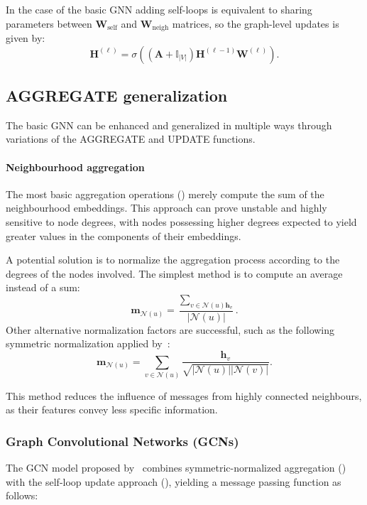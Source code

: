 In the case of the basic GNN adding self-loops is equivalent to sharing parameters between $\mathbf{W}_\text{self}$ and $\mathbf{W}_\text{neigh}$ matrices, so the graph-level updates is given by:
\begin{equation}\label{eq:basicGNNgraphlevelselfLoop}
    \mathbf{H}^{(\ell)} = \sigma\left(\left(\mathbf{A} + \mathbb{I}_{|V|}\right)\mathbf{H}^{(\ell-1)}\mathbf{W}^{(\ell)}\right).
\end{equation}


\subsection{AGGREGATE generalization}
The basic GNN can be enhanced and generalized in multiple ways through variations of the AGGREGATE and UPDATE functions.

\paragraph{Neighbourhood aggregation}
The most basic aggregation operations () merely compute the sum of the neighbourhood embeddings. This approach can prove unstable and highly sensitive to node degrees, with nodes possessing higher degrees expected to yield greater values in the components of their embeddings.

A potential solution is to normalize the aggregation process according to the degrees of the nodes involved. The simplest method is to compute an average instead of a sum:
\begin{equation*}
    \mathbf{m}_{\mathcal{N}(u)} = \frac{\sum_{v \in \mathcal{N}(u) \mathbf{h}_v}}{|\mathcal{N}(u)|}.
\end{equation*}
Other alternative normalization factors are successful, such as the following symmetric normalization applied by~\cite{kipf2016semi}:
\begin{equation}\label{eq:symmetricNormalization}
    \mathbf{m}_{\mathcal{N}(u)} = \sum_{v \in \mathcal{N}(u)}\frac{ \mathbf{h}_v}{\sqrt{|\mathcal{N}(u)||\mathcal{N}(v)|}}.
\end{equation}

This method reduces the influence of messages from highly connected neighbours, as their features convey less specific information.

\subsubsection{Graph Convolutional Networks (GCNs)}\label{sec:GCN}
The GCN model proposed by~\cite{kipf2016semi} combines symmetric-normalized aggregation () with the self-loop update approach (), yielding a message passing function as follows:

